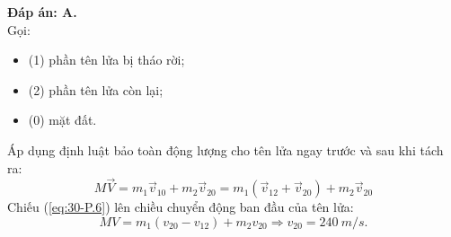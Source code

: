 \begin{enumerate}[label=\bfseries Câu \arabic*:, leftmargin=1.5cm]
	\hideall
	{	
		\textbf{Đáp án: A.}\\
		Gọi:
		\begin{itemize}
			\item (1) phần tên lửa bị tháo rời;
			\item (2) phần tên lửa còn lại;
			\item (0) mặt đất.
		\end{itemize}
		Áp dụng định luật bảo toàn động lượng cho tên lửa ngay trước và sau khi tách ra:
		\begin{equation}
			\label{eq:30-P.6}
			M\vec V=m_1\vec v_{10}+m_2\vec v_{20}=m_1\left(\vec v_{12}+\vec v_{20}\right)+m_2\vec v_{20}
		\end{equation}
		Chiếu (\ref{eq:30-P.6}) lên chiều chuyển động ban đầu của tên lửa:
		$$MV = m_1\left(v_{20}-v_{12}\right)+m_2v_{20}\Rightarrow v_{20} = \SI{240}{m/s}.$$
	}
	

\end{enumerate}
